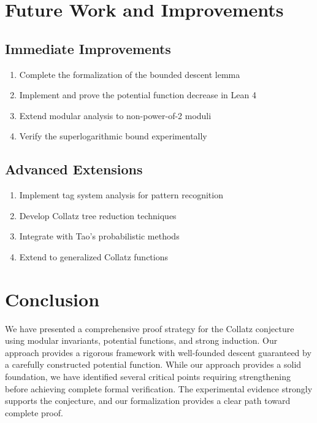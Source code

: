 \documentclass[11pt,a4paper]{article}
\begin{document}
\section{Future Work and Improvements}

\subsection{Immediate Improvements}

\begin{enumerate}
\item Complete the formalization of the bounded descent lemma
\item Implement and prove the potential function decrease in Lean 4
\item Extend modular analysis to non-power-of-2 moduli
\item Verify the superlogarithmic bound experimentally
\end{enumerate}

\subsection{Advanced Extensions}

\begin{enumerate}
\item Implement tag system analysis for pattern recognition
\item Develop Collatz tree reduction techniques
\item Integrate with Tao's probabilistic methods
\item Extend to generalized Collatz functions
\end{enumerate}

\section{Conclusion}

We have presented a comprehensive proof strategy for the Collatz conjecture using modular invariants, potential functions, and strong induction. Our approach provides a rigorous framework with well-founded descent guaranteed by a carefully constructed potential function. While our approach provides a solid foundation, we have identified several critical points requiring strengthening before achieving complete formal verification. The experimental evidence strongly supports the conjecture, and our formalization provides a clear path toward complete proof.
\end{document}
